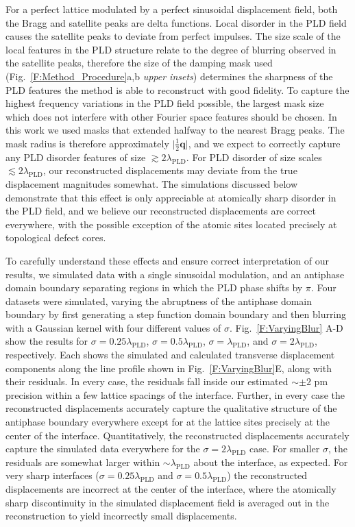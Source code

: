 \documentclass[12pt]{article}
\begin{document}
For a perfect lattice modulated by a perfect sinusoidal displacement field, both the Bragg and satellite peaks are delta functions.
Local disorder in the PLD field causes the satellite peaks to deviate from perfect impulses.
The size scale of the local features in the PLD structure relate to the degree of blurring observed in the satellite peaks, therefore the size of the damping mask used (Fig.~\ref{F:Method_Procedure}a,b \textit{upper insets}) determines the sharpness of the PLD features the method is able to reconstruct with good fidelity.
To capture the highest frequency variations in the PLD field possible, the largest mask size which does not interfere with other Fourier space features should be chosen.
In this work we used masks that extended halfway to the nearest Bragg peaks.
The mask radius is therefore approximately $\lvert\frac{1}{2}\mathbf{q}\rvert$, and we expect to correctly capture any PLD disorder features of size $\gtrsim 2\lambda_\text{PLD}$.
For PLD disorder of size scales $\lesssim 2\lambda_\text{PLD}$, our reconstructed displacements may deviate from the true displacement magnitudes somewhat. 
The simulations discussed below demonstrate that this effect is only appreciable at atomically sharp disorder in the PLD field, and we believe our reconstructed displacements are correct everywhere, with the possible exception of the atomic sites located precisely at topological defect cores.


To carefully understand these effects and ensure correct interpretation of our results, we simulated data with a single sinusoidal modulation, and an antiphase domain boundary separating regions in which the PLD phase shifts by $\pi$.
Four datasets were simulated, varying the abruptness of the antiphase domain boundary by first generating a step function domain boundary and then blurring with a Gaussian kernel with four different values of $\sigma$.
Fig.~\ref{F:VaryingBlur} A-D show the results for $\sigma=0.25\lambda_\text{PLD}$, $\sigma=0.5\lambda_\text{PLD}$, $\sigma=\lambda_\text{PLD}$, and $\sigma=2\lambda_\text{PLD}$, respectively.
Each shows the simulated and calculated transverse displacement components along the line profile shown in Fig.~\ref{F:VaryingBlur}E, along with their residuals.
In every case, the residuals fall inside our estimated $\sim\pm2$ pm precision within a few lattice spacings of the interface.
Further, in every case the reconstructed displacements accurately capture the qualitative structure of the antiphase boundary everywhere except for at the lattice sites precisely at the center of the interface.
Quantitatively, the reconstructed displacements accurately capture the simulated data everywhere for the $\sigma=2\lambda_\text{PLD}$ case.
For smaller $\sigma$, the residuals are somewhat larger within $\sim\lambda_\text{PLD}$ about the interface, as expected.
For very sharp interfaces ($\sigma=0.25\lambda_\text{PLD}$ and $\sigma=0.5\lambda_\text{PLD}$) the reconstructed displacements are incorrect at the center of the interface, where the atomically sharp discontinuity in the simulated displacement field is averaged out in the reconstruction to yield incorrectly small displacements.
\end{document}

